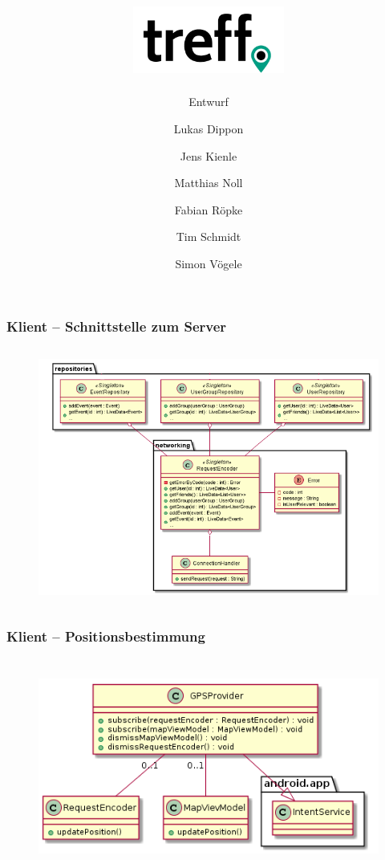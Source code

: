 \documentclass[aspectratio=1610]{beamer}
\title{\includegraphics[width = 50mm]{images/logo_crop.png}}
\subtitle{\huge Entwurf}
\author{Lukas Dippon
	\and Jens Kienle
	\and Matthias Noll
	\and Fabian Röpke
	\and Tim Schmidt
	\and Simon Vögele}
\begin{document}
	\begin{frame}[plain]
	\maketitle
	\end{frame}


    \begin{frame}[plain]
      \frametitle{\textbf{Klient} -- Schnittstelle zum Server}
      \begin{figure}[!htb]
        \centering
        \includegraphics[height = 240pt]{images/connection_client.png}
        \end{figure}
    \end{frame}
    
     \begin{frame}[plain]
      \frametitle{\textbf{Klient} -- Positionsbestimmung}
      \begin{figure}[!htb]
        \centering
        \includegraphics[height = 200pt]{images/gpsprovider.png}
        \end{figure}
    \end{frame}
        
\end{document}
